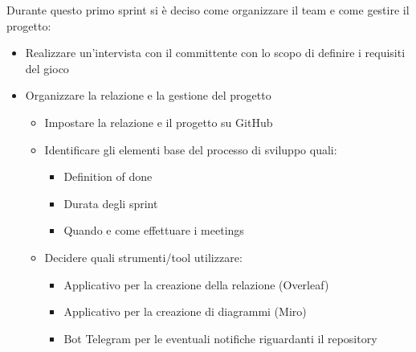 Durante questo primo sprint si è deciso come organizzare il team e come gestire il progetto:
\begin{itemize}
    \item Realizzare un'intervista con il committente con lo scopo di definire i requisiti del gioco
    \item Organizzare la relazione e la gestione del progetto
    \begin{itemize}
        \item Impostare la relazione e il progetto su GitHub
        \item Identificare gli elementi base del processo di sviluppo quali:
            \begin{itemize}
                \item Definition of done
                \item Durata degli sprint
                \item Quando e come effettuare i meetings
            \end{itemize}  
        \item Decidere quali strumenti/tool utilizzare:
            \begin{itemize}
                \item Applicativo per la creazione della relazione (Overleaf)
                \item Applicativo per la creazione di diagrammi (Miro)
                \item Bot Telegram per le eventuali notifiche riguardanti il repository
            \end{itemize}        
        \end{itemize}   
\end{itemize}
